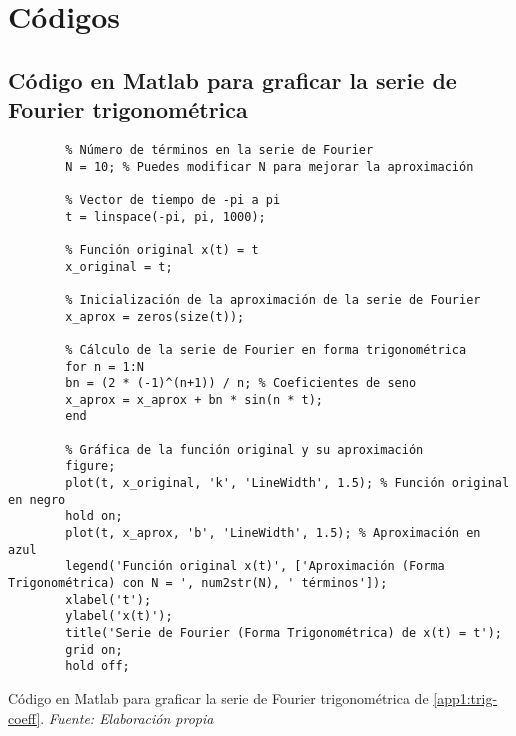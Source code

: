 \chapter{Códigos}\label{app2:Estado-del-arte-codes}

\section{Código en Matlab para graficar la serie de Fourier trigonométrica}\label{app2:trig-code-matlab}
\begin{longlisting}
	\begin{verbatim}
		% Número de términos en la serie de Fourier
		N = 10; % Puedes modificar N para mejorar la aproximación
		
		% Vector de tiempo de -pi a pi
		t = linspace(-pi, pi, 1000);
		
		% Función original x(t) = t
		x_original = t;
		
		% Inicialización de la aproximación de la serie de Fourier
		x_aprox = zeros(size(t));
		
		% Cálculo de la serie de Fourier en forma trigonométrica
		for n = 1:N
		bn = (2 * (-1)^(n+1)) / n; % Coeficientes de seno
		x_aprox = x_aprox + bn * sin(n * t);
		end
		
		% Gráfica de la función original y su aproximación
		figure;
		plot(t, x_original, 'k', 'LineWidth', 1.5); % Función original en negro
		hold on;
		plot(t, x_aprox, 'b', 'LineWidth', 1.5); % Aproximación en azul
		legend('Función original x(t)', ['Aproximación (Forma Trigonométrica) con N = ', num2str(N), ' términos']);
		xlabel('t');
		ylabel('x(t)');
		title('Serie de Fourier (Forma Trigonométrica) de x(t) = t');
		grid on;
		hold off;		
	\end{verbatim}
		\caption[Código en Matlab para graficar la serie de Fourier trigonométrica de \ref{app1:trig-coeff}.] {Código en Matlab para graficar la serie de Fourier trigonométrica de \ref{app1:trig-coeff}. \textit{Fuente: Elaboración propia}} 

\end{longlisting}

